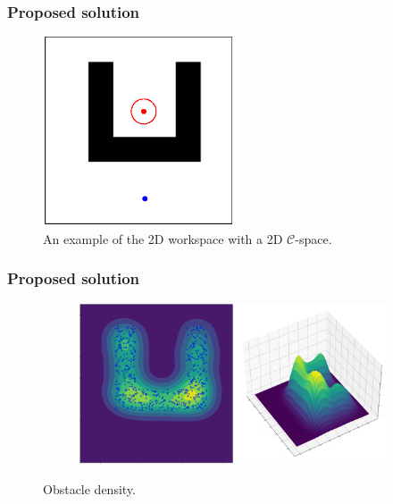 \documentclass{beamer}
\begin{document}

\begin{frame}
	\frametitle{Proposed solution}	
	\begin{figure}[!ht]
		\centering 
		  \includegraphics[width=0.5\textwidth]{figChap4/SimpleMaze.eps} 
		\caption{An example of the 2D workspace with a 2D $\mathcal{C}$-space.}
		\label{fig:GKDEmaze}
	  \end{figure}
\end{frame}	

\begin{frame}
	\frametitle{Proposed solution}	
	\begin{figure}[!ht]
		\centering 
		\begin{subfigure}[b]{1\textwidth}
			\includegraphics[width=\textwidth]{figChap4/GKDE_obsU.pdf} 
		\end{subfigure}   
		\caption{Obstacle density.} 
	  \end{figure}
\end{frame}	
\end{document}
